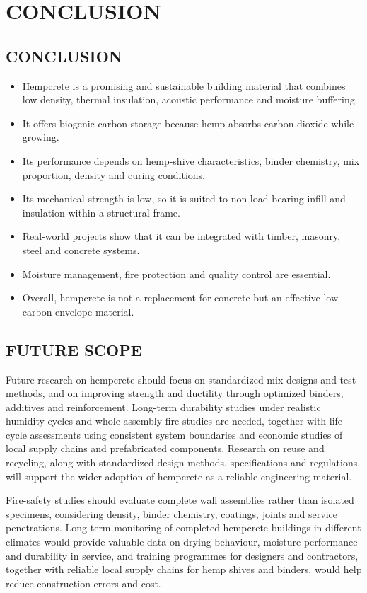 \documentclass[12pt,a4paper,final]{report}
\begin{document}
\chapter{CONCLUSION}
\section[Conclusion]{CONCLUSION}
\begin{itemize}[label=\textbullet,leftmargin=2.4em,itemsep=6pt,topsep=2pt,parsep=0pt]
\item Hempcrete is a promising and sustainable building material that combines low density, thermal insulation, acoustic performance and moisture buffering.
\item It offers biogenic carbon storage because hemp absorbs carbon dioxide while growing.
\item Its performance depends on hemp-shive characteristics, binder chemistry, mix proportion, density and curing conditions.
\item Its mechanical strength is low, so it is suited to non-load-bearing infill and insulation within a structural frame.
\item Real-world projects show that it can be integrated with timber, masonry, steel and concrete systems.
\item Moisture management, fire protection and quality control are essential.
\item Overall, hempcrete is not a replacement for concrete but an effective low-carbon envelope material.
\end{itemize}
\newpage
\section[Future Scope]{FUTURE SCOPE}
Future research on hempcrete should focus on standardized mix designs and test methods, and on
improving strength and ductility through optimized binders, additives and reinforcement.
Long-term durability studies under realistic humidity cycles and whole-assembly fire studies are
needed, together with life-cycle assessments using consistent system boundaries and economic
studies of local supply chains and prefabricated components. Research on reuse and recycling,
along with standardized design methods, specifications and regulations, will support the wider
adoption of hempcrete as a reliable engineering material.

Fire-safety studies should evaluate complete wall assemblies rather than isolated specimens,
considering density, binder chemistry, coatings, joints and service penetrations. Long-term
monitoring of completed hempcrete buildings in different climates would provide valuable data
on drying behaviour, moisture performance and durability in service, and training programmes
for designers and contractors, together with reliable local supply chains for hemp shives and
binders, would help reduce construction errors and cost.
\end{document}
